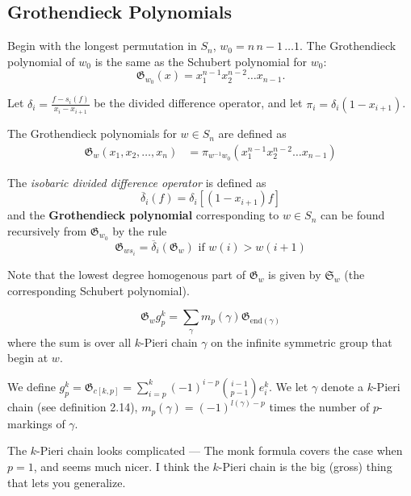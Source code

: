 \documentclass[11pt]{article}
\begin{document}
\subsection{Grothendieck Polynomials}

Begin with the longest permutation in $S_n$, $w_0 = n \, n-1 \, \dots 1$. The Grothendieck polynomial of $w_0$ is the same as the Schubert polynomial for $w_0$:
\[
    \mathfrak{G}_{w_0}(x) = x_1^{n-1} x_2^{n-2} \dots x_{n-1}.
\]
\begin{definition}
Let $\delta_i = \frac{f - s_i(f)}{x_i - x_{i+1}}$ be the divided difference operator, and let $\pi_i = \delta_i(1-x_{i+1})$. 

The Grothendieck polynomials for $w \in S_n$ are defined as
\begin{align*}
    \mathfrak{G}_w(x_1, x_2, \ldots, x_n) &= \pi_{w^{-1}w_0}(x_1^{n-1} x_2^{n-2} \ldots x_{n-1}) 
\end{align*}
\end{definition}


\begin{definition}
The \textit{isobaric divided difference operator} is defined as
\[
    \overline{\delta}_i(f) = \delta_i[(1-x_{i+1})f]
\] 
and the \textbf{Grothendieck polynomial} corresponding to $w \in S_n$ can be found recursively from $\mathfrak{G}_{w_0}$ by the rule
\[
    \mathfrak{G}_{ws_i} = \overline{\delta}_i(\mathfrak{G}_w) \text{ if $w(i) > w(i+1)$}
\]
\end{definition}

Note that the lowest degree homogenous part of $\mathfrak{G}_w$ is given by $\mathfrak{S}_w$ (the corresponding Schubert polynomial). 

\begin{theorem}
    \begin{equation*}
        \mathfrak{G}_wg_p^k = \sum_\gamma m_p(\gamma) \mathfrak{G}_{\text{end}(\gamma)}
    \end{equation*} 
    where the sum is over all $k$-Pieri chain $\gamma$ on the infinite symmetric group that begin at $w$.

    We define $g_p^k = \mathfrak{G}_{c[k,p]} = \sum_{i=p}^k (-1)^{i-p} {{i-1}\choose{p-1}} e_i^k$. We let $\gamma$ denote a $k$-Pieri chain (see definition 2.14), $m_p(\gamma) = (-1)^{l(\gamma) -p}$ times the number of $p$-markings of $\gamma$.
\end{theorem}
The $k$-Pieri chain looks complicated — The monk formula covers the case when $p = 1$, and seems much nicer. I think the $k$-Pieri chain is the big (gross) thing that lets you generalize.
\end{document}
